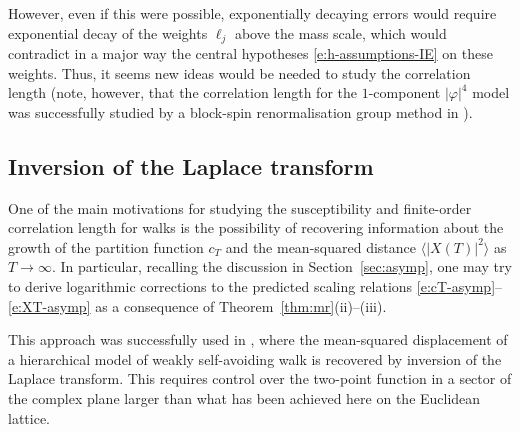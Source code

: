 However, even if this were possible, exponentially decaying errors would require
exponential decay of the weights $\ell_j$ above the mass scale, which would contradict
in a major way the central hypotheses \eqref{e:h-assumptions-IE} on these weights.
Thus, it seems new ideas would be needed to study the correlation length (note,
however, that the correlation length for the $1$-component $|\varphi|^4$ model
was successfully studied by a block-spin renormalisation group method in \cite{HT87}).


\subsection{Inversion of the Laplace transform}

One of the main motivations for studying the
susceptibility and finite-order correlation length for walks is the possibility
of recovering information about the growth of the partition function $c_T$ and
the mean-squared distance $\langle |X(T)|^2 \rangle$ as $T\to\infty$. In
particular, recalling the discussion in Section~\ref{sec:asymp}, one may
try to derive logarithmic corrections to the predicted scaling relations
\eqref{e:cT-asymp}--\eqref{e:XT-asymp} as a consequence of Theorem~\ref{thm:mr}(ii)--(iii).

This approach was successfully used in \cite{BI03c}, where the mean-squared displacement
of a hierarchical model of weakly self-avoiding walk is recovered by inversion of
the Laplace transform. This requires control over the two-point function in a
sector of the complex plane larger than what has been achieved here on the
Euclidean lattice.

